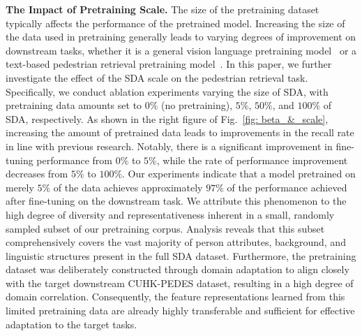 \noindent\textbf{The Impact of Pretraining Scale.} 
The size of the pretraining dataset typically affects the performance of the pretrained model. Increasing the size of the data used in pretraining generally leads to varying degrees of improvement on downstream tasks, whether it is a general vision language pretraining model~\cite{radford2021learning, li2021align} or a text-based pedestrian retrieval pretraining model~\cite{yang2023towards}. In this paper, we further investigate the effect of the SDA scale on the pedestrian retrieval task. Specifically, we conduct ablation experiments varying the size of SDA, with pretraining data amounts set to $0 \%$ (no pretraining), $5 \%$, $50 \%$, and $100 \%$ of SDA, respectively. As shown in the right figure of Fig.~\ref{fig: beta_&_scale}, increasing the amount of pretrained data leads to improvements in the recall rate in line with previous research. Notably, there is a significant improvement in fine-tuning performance from $0 \%$ to $5 \%$, while the rate of performance improvement decreases from $5 \%$ to $100 \%$.
Our experiments indicate that a model pretrained on merely $5\%$ of the data achieves approximately $97\%$ of the performance achieved after fine-tuning on the downstream task. We attribute this phenomenon to the high degree of diversity and representativeness inherent in a small, randomly sampled subset of our pretraining corpus. Analysis reveals that this subset comprehensively covers the vast majority of person attributes, background, and linguistic structures present in the full SDA dataset. Furthermore, the pretraining dataset was deliberately constructed through domain adaptation to align closely with the target downstream CUHK-PEDES dataset, resulting in a high degree of domain correlation. Consequently, the feature representations learned from this limited pretraining data are already highly transferable and sufficient for effective adaptation to the target tasks.





